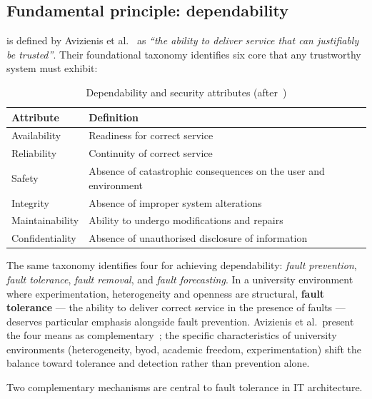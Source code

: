 \subsection{Fundamental principle: dependability}
\label{subsec:dependability}

 is defined by Avizienis et
al.~\cite{avizienis2004} as \emph{``the ability to deliver service
that can justifiably be trusted''}. Their foundational taxonomy
identifies six core  that any trustworthy system must
exhibit:

\begin{table}[H]
\centering
\caption{Dependability and security attributes (after~\cite{avizienis2004})}
\label{tab:dependability-attributes}
\small
\begin{tabularx}{0.92\textwidth}{l X}
\toprule
\textbf{Attribute} & \textbf{Definition} \\
\midrule
Availability    & Readiness for correct service \\
Reliability     & Continuity of correct service \\
Safety          & Absence of catastrophic consequences on the user and environment \\
Integrity       & Absence of improper system alterations \\
Maintainability & Ability to undergo modifications and repairs \\
Confidentiality & Absence of unauthorised disclosure of information \\
\bottomrule
\end{tabularx}
\end{table}

\noindent
The same taxonomy identifies four  for achieving
dependability: \emph{fault prevention}, \emph{fault tolerance},
\emph{fault removal}, and \emph{fault forecasting}. In a university
environment where experimentation, heterogeneity and openness are
structural, \textbf{fault tolerance} --- the ability to deliver correct
service in the presence of faults --- deserves particular emphasis
alongside fault prevention. Avizienis et al.\ present the four
means as complementary~\cite{avizienis2004, guelfi2007ftsystems}; the specific
characteristics of university environments (heterogeneity, \gls{byod},
academic freedom, experimentation) shift the balance toward
tolerance and detection rather than prevention alone.

\medskip
Two complementary mechanisms are central to fault tolerance in IT
architecture.

